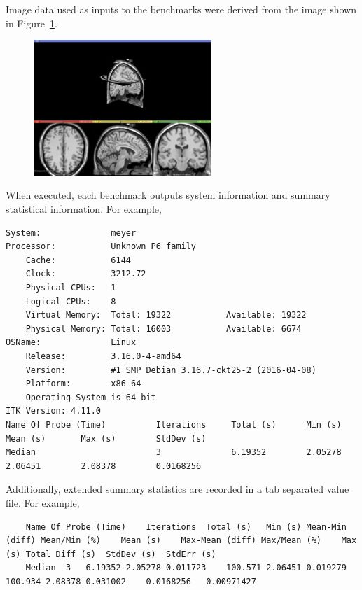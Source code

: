 \documentclass{InsightArticle}
\begin{document}
Image data used as inputs to the benchmarks were derived from the image shown in
Figure~\ref{fig:InputBrainWeb}.

\begin{figure}
\center
\includegraphics[width=0.6\textwidth]{InputBrainWeb}
\label{fig:InputBrainWeb}
\end{figure}

When executed, each benchmark outputs system information and summary
statistical information. For example,

\scriptsize
\begin{verbatim}
System:              meyer
Processor:           Unknown P6 family
    Cache:           6144
    Clock:           3212.72
    Physical CPUs:   1
    Logical CPUs:    8
    Virtual Memory:  Total: 19322           Available: 19322
    Physical Memory: Total: 16003           Available: 6674
OSName:              Linux
    Release:         3.16.0-4-amd64
    Version:         #1 SMP Debian 3.16.7-ckt25-2 (2016-04-08)
    Platform:        x86_64
    Operating System is 64 bit
ITK Version: 4.11.0
Name Of Probe (Time)          Iterations     Total (s)      Min (s)        Mean (s)       Max (s)        StdDev (s)
Median                        3              6.19352        2.05278        2.06451        2.08378        0.0168256
\end{verbatim}
\normalsize

Additionally, extended summary statistics are recorded in a tab separated
value file. For example,

\tiny
\begin{verbatim}
	Name Of Probe (Time)	Iterations	Total (s)	Min (s)	Mean-Min (diff)	Mean/Min (%)	Mean (s)	Max-Mean (diff)	Max/Mean (%)	Max (s)	Total Diff (s)	StdDev (s)	StdErr (s)
	Median	3	6.19352	2.05278	0.011723	100.571	2.06451	0.019279	100.934	2.08378	0.031002	0.0168256	0.00971427
\end{verbatim}
\normalsize
\end{document}
